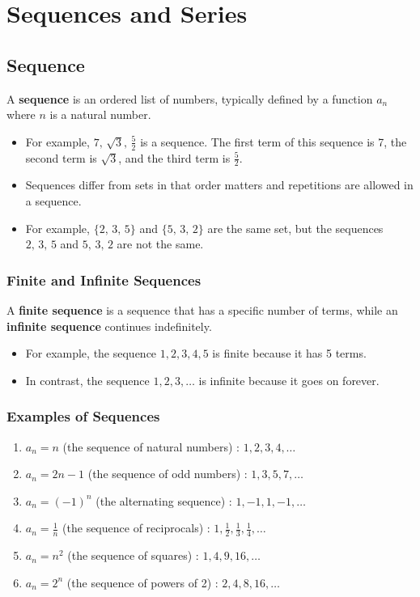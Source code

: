 \chapter{Sequences and Series}
\label{sec:sequence-series}

\section{Sequence}
A \textbf{sequence} is an ordered list of numbers, typically defined by a function \( a_n \) where \( n \) is a natural number.
\begin{itemize}
    \item For example, \(7,\, \sqrt{3},\, \frac{5}{2}\) is a sequence. The first term of this sequence is 7, the second term is \(\sqrt{3}\), and the third term is \(\frac{5}{2}\).
    \item Sequences differ from sets in that order matters and repetitions are allowed in a sequence.
    \item For example, \(\{2,\, 3,\, 5\}\) and \(\{5,\, 3,\, 2\}\) are the same set, but the sequences \(2,\, 3,\, 5\) and \(5,\, 3,\, 2\) are not the same.
\end{itemize}

\subsection{Finite and Infinite Sequences}
A \textbf{finite sequence} is a sequence that has a specific number of terms, while an \textbf{infinite sequence} continues indefinitely.
\begin{itemize}
    \item For example, the sequence \(1, 2, 3, 4, 5\) is finite because it has 5 terms.
    \item In contrast, the sequence \(1, 2, 3, \ldots\) is infinite because it goes on forever.
\end{itemize}

\subsection{Examples of Sequences}
\begin{enumerate}
    \item \(a_n = n\) (the sequence of natural numbers) : \(1, 2, 3, 4, \ldots\)
    \item \(a_n = 2n - 1\) (the sequence of odd numbers) : \(1, 3, 5, 7, \ldots\)
    \item \(a_n = (-1)^n\) (the alternating sequence) : \(1, -1, 1, -1, \ldots\)
    \item \(a_n = \frac{1}{n}\) (the sequence of reciprocals) : \(1, \frac{1}{2}, \frac{1}{3}, \frac{1}{4}, \ldots\)
    \item \(a_n = n^2\) (the sequence of squares) : \(1, 4, 9, 16, \ldots\)
    \item \(a_n = 2^n\) (the sequence of powers of 2) : \(2, 4, 8, 16, \ldots\)
\end{enumerate}

